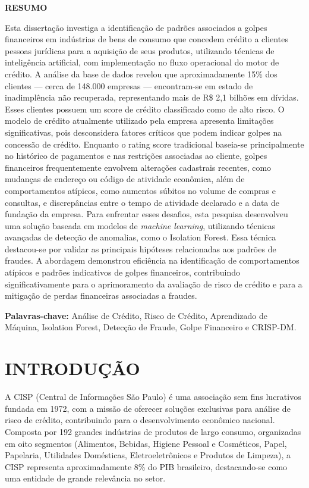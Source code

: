 \documentclass[12pt,a4paper]{article}
\begin{document}
\newpage
\thispagestyle{plain}
\begin{center}
\large
\textbf{RESUMO}
\end{center}
\renewcommand{\baselinestretch}{0.6666666}
Esta dissertação investiga a identificação de padrões associados a golpes financeiros em indústrias de bens de consumo que concedem crédito a clientes pessoas jurídicas para a aquisição de seus produtos, utilizando técnicas de inteligência artificial, com implementação no fluxo operacional do motor de crédito.
A análise da base de dados revelou que aproximadamente 15\% dos clientes — cerca de 148.000 empresas — encontram-se em estado de inadimplência não recuperada, representando mais de R\$ 2,1 bilhões em dívidas. Esses clientes possuem um score de crédito classificado como de alto risco.
O modelo de crédito atualmente utilizado pela empresa apresenta limitações significativas, pois desconsidera fatores críticos que podem indicar golpes na concessão de crédito. Enquanto o rating score tradicional baseia-se principalmente no histórico de pagamentos e nas restrições associadas ao cliente, golpes financeiros frequentemente envolvem alterações cadastrais recentes, como mudanças de endereço ou código de atividade econômica, além de comportamentos atípicos, como aumentos súbitos no volume de compras e consultas, e discrepâncias entre o tempo de atividade declarado e a data de fundação da empresa.
Para enfrentar esses desafios, esta pesquisa desenvolveu uma solução baseada em modelos de \textit{machine learning}, utilizando técnicas avançadas de detecção de anomalias, como o Isolation Forest. Essa técnica destacou-se por validar as principais hipóteses relacionadas aos padrões de fraudes. A abordagem demonstrou eficiência na identificação de comportamentos atípicos e padrões indicativos de golpes financeiros, contribuindo significativamente para o aprimoramento da avaliação de risco de crédito e para a mitigação de perdas financeiras associadas a fraudes.
\\[0.5cm]
\begin{flushleft}
{\bf Palavras-chave:} {Análise de Crédito, Risco de Crédito, Aprendizado de Máquina, Isolation Forest, Detecção de Fraude, Golpe Financeiro e CRISP-DM.}
\end{flushleft}

\newpage
\thispagestyle{empty}
\tableofcontents

\newpage
\pagestyle{plain}
\renewcommand{\baselinestretch}{1.5}
\normalsize
\section{INTRODUÇÃO}
A CISP (Central de Informações São Paulo) é uma associação sem fins lucrativos fundada em 1972, com a missão de oferecer soluções exclusivas para análise de risco de crédito, contribuindo para o desenvolvimento econômico nacional. Composta por 192 grandes indústrias de produtos de largo consumo, organizadas em oito segmentos (Alimentos, Bebidas, Higiene Pessoal e Cosméticos, Papel, Papelaria, Utilidades Domésticas, Eletroeletrônicos e Produtos de Limpeza), a CISP representa aproximadamente 8\% do PIB brasileiro, destacando-se como uma entidade de grande relevância no setor.
\end{document}
